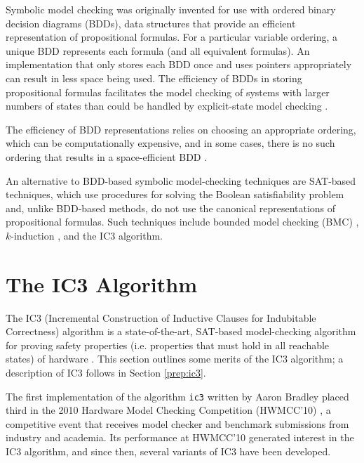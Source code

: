 \documentclass[12pt,a4paper,twoside,openright]{report}
\begin{document}
Symbolic model checking was originally invented for use with ordered
binary decision diagrams (BDDs), data structures that provide an efficient
representation of propositional formulas. For a particular variable
ordering, a unique BDD represents each formula (and all equivalent formulas).
An implementation that only stores each BDD once and uses pointers appropriately
can result in less space being used.
The efficiency of BDDs in storing propositional formulas facilitates the model
checking of systems with larger numbers of states than could be handled
by explicit-state model checking \cite{mcmillan92}.

The efficiency of BDD representations relies on choosing an appropriate
ordering, which can be computationally expensive, and in some cases,
there is no such ordering that results in a space-efficient BDD
\cite{biere99a}.

An alternative to BDD-based symbolic model-checking techniques are SAT-based
techniques, which use procedures for solving the Boolean satisfiability
problem and, unlike BDD-based methods, do not use the canonical representations
of propositional formulas.
Such techniques include bounded model checking (BMC)
\cite{biere99a}, $k$-induction \cite{sheeran00},
and the IC3 algorithm.


\section{The IC3 Algorithm}


The IC3 (Incremental Construction of Inductive Clauses for Indubitable Correctness)
algorithm is a state-of-the-art,
SAT-based model-checking
algorithm for proving safety properties (i.e. properties that must hold
in all reachable states) of hardware \cite{bradley11}. This section outlines some
merits of the IC3 algorithm; a description of IC3 follows in Section
\ref{prep:ic3}.

The first implementation of the algorithm \verb,ic3, written by Aaron Bradley placed third in
the 2010 Hardware Model Checking Competition (HWMCC'10) \cite{hwmcc10},
a competitive event that receives model checker and benchmark submissions from
industry and
academia. Its performance at HWMCC'10 generated interest in the IC3 algorithm, and
since then, several variants of IC3 have been developed.
\end{document}
